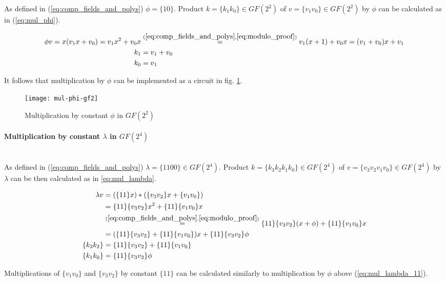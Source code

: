 As defined in (\ref{eq:comp_fields_and_polys}) $\phi = \{10\}$. Product $k = \{k_1k_0\} \in GF(2^2)$ of $v = \{v_1v_0\} \in GF(2^2)$ by $\phi$ can be calculated as in (\ref{eq:mul_phi}).

\begin{equation}
\label{eq:mul_phi}
\begin{aligned}
\phi v = x (v_1x + v_0) = v_1x^2 + v_0x &\stackrel{(\ref{eq:comp_fields_and_polys}, \ref{eq:modulo_proof})}{=} v_1(x + 1) + v_0x = (v_1 + v_0)x + v_1\\
k_1 &= v_1 + v_0\\
k_0 &= v_1
\end{aligned}
\end{equation}

It follows that multiplication by $\phi$ can be implemented as a circuit in fig. \ref{fig:phi_mul}.

\begin{figure}[!h]
\centering
\texttt{[image: mul-phi-gf2]}
\caption{Multiplication by constant $\phi$ in $GF(2^2)$}
\label{fig:phi_mul}
\end{figure}

\paragraph{Multiplication by constant $\lambda$ in $GF(2^4)$}\mbox{}\\
As defined in (\ref{eq:comp_fields_and_polys}) $\lambda = \{1100\} \in GF(2^4)$. Product $k = \{k_3k_2k_1k_0\} \in GF(2^4)$ of $v = \{v_3v_2v_1v_0\} \in GF(2^4)$ by $\lambda$ can be then calculated as in \ref{eq:mul_lambda}.

\begin{equation}
\label{eq:mul_lambda}
\begin{aligned}
\lambda v &= (\{11\}x) * (\{v_3v_2\}x + \{v_1v_0\})\\
&= \{11\}\{v_3v_2\}x^2 + \{11\}\{v_1v_0\}x\\
&\stackrel{(\ref{eq:comp_fields_and_polys}, \ref{eq:modulo_proof})}{=}
\{11\}\{v_3v_2\}(x + \phi) + \{11\}\{v_1v_0\}x \\
&= (\{11\}\{v_3v_2\} + \{11\}\{v_1v_0\})x + \{11\}\{v_3v_2\}\phi\\
\{k_3k_2\} &= \{11\}\{v_3v_2\} + \{11\}\{v_1v_0\}\\
\{k_1k_0\} &= \{11\}\{v_3v_2\}\phi
\end{aligned}
\end{equation}

Multiplications of $\{v_1v_0\}$ and $\{v_3v_2\}$ by constant $\{11\}$ can be calculated similarly to multiplication by $\phi$ above (\ref{eq:mul_lambda_11}).

